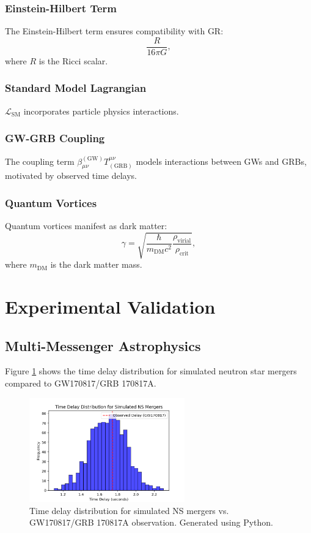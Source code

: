 \documentclass[12pt,a4paper]{article}
\begin{document}
\subsubsection{Einstein-Hilbert Term}
The Einstein-Hilbert term ensures compatibility with GR:
\[
\frac{R}{16\pi G},
\]
where $R$ is the Ricci scalar.

\subsubsection{Standard Model Lagrangian}
$\mathcal{L}_{\text{SM}}$ incorporates particle physics interactions.

\subsubsection{GW-GRB Coupling}
The coupling term $\beta^{(\text{GW})}_{\mu\nu} T^{\mu\nu}_{(\text{GRB})}$ models interactions between GWs and GRBs, motivated by observed time delays.

\subsubsection{Quantum Vortices}
Quantum vortices manifest as dark matter:
\[
\gamma = \sqrt{\frac{\hbar}{m_{\text{DM}} c^2} \frac{\rho_{\text{virial}}}{\rho_{\text{crit}}}},
\]
where $m_{\text{DM}}$ is the dark matter mass.

\section{Experimental Validation}
\subsection{Multi-Messenger Astrophysics}
Figure \ref{fig:time_delay} shows the time delay distribution for simulated neutron star mergers compared to GW170817/GRB 170817A.

\begin{figure}[h!]
\centering
\includegraphics[width=0.6\textwidth]{gw_grb_delay.png}
\caption{Time delay distribution for simulated NS mergers vs. GW170817/GRB 170817A observation. Generated using Python.}
\label{fig:time_delay}
\end{figure}
\end{document}
